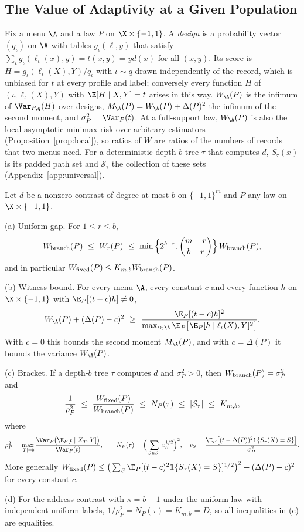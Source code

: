 \subsection{The Value of Adaptivity at a Given Population}\label{app:population}
Fix a menu $\A$ and a law $P$ on $\X\times\{-1,1\}$. A \emph{design} is a
probability vector $(q_\iota)$ on $\A$ with tables $g_\iota(\ell,y)$ that
satisfy $\sum_\iota g_\iota(\ell_\iota(x),y)=t(x,y)=yd(x)$ for all $(x,y)$.
Its score is $H=g_\iota(\ell_\iota(X),Y)/q_\iota$ with $\iota\sim q$ drawn
independently of the record, which is unbiased for $t$ at every profile and
label; conversely every function $H$ of $(\iota,\ell_\iota(X),Y)$ with
$\E[H\mid X,Y]=t$ arises in this way. $W_\A(P)$ is the infimum of
$\Var_{P,q}(H)$ over designs, $M_\A(P)=W_\A(P)+\Delta(P)^2$ the infimum of
the second moment, and $\sigma_P^2=\Var_P(t)$. At a full-support law,
$W_\A(P)$ is also the local asymptotic minimax risk over arbitrary estimators
(Proposition~\ref{prop:local}), so ratios of $W$ are ratios of the numbers of
records that two menus need. For a deterministic depth-$b$ tree $\tau$ that
computes $d$, $S_\tau(x)$ is its padded path set and $\mathcal S_\tau$ the
collection of these sets (Appendix~\ref{app:universal}).

\begin{theorem}\label{thm:bracketfull}
Let $d$ be a nonzero contrast of degree at most $b$ on $\{-1,1\}^m$ and $P$ any
law on $\X\times\{-1,1\}$.

\textup{(a) Uniform gap.} For $1\le r\le b$,
\[
 W_{\rm branch}(P)\ \le\ W_r(P)\ \le\ \min\Big\{2^{b-r},\binom{m-r}{b-r}\Big\}\,W_{\rm branch}(P),
\]
and in particular $W_{\rm fixed}(P)\le K_{m,b}W_{\rm branch}(P)$.

\textup{(b) Witness bound.} For every menu $\A$, every constant $c$ and
every function $h$ on $\X\times\{-1,1\}$ with $\E_P[(t-c)h]\ne0$,
\[
 W_\A(P)+(\Delta(P)-c)^2\ \ge\ \frac{\E_P[(t-c)h]^2}{\max_{\iota\in\A}\E_P\big[\E_P[h\mid\ell_\iota(X),Y]^2\big]}.
\]
With $c=0$ this bounds the second moment $M_\A(P)$, and with $c=\Delta(P)$ it
bounds the variance $W_\A(P)$.

\textup{(c) Bracket.} If a depth-$b$ tree $\tau$ computes $d$ and
$\sigma_P^2>0$, then $W_{\rm branch}(P)=\sigma_P^2$ and
\[
 \frac1{\rho_P^2}\ \le\ \frac{W_{\rm fixed}(P)}{W_{\rm branch}(P)}\ \le\ N_P(\tau)\ \le\ |\mathcal S_\tau|\ \le\ K_{m,b},
\]
where
\[
 \rho_P^2=\max_{|T|=b}\frac{\Var_P\big(\E_P[t\mid X_T,Y]\big)}{\Var_P(t)},
 \qquad
 N_P(\tau)=\Big(\sum_{S\in\mathcal S_\tau}v_S^{1/2}\Big)^2,
 \quad v_S=\frac{\E_P\big[(t-\Delta(P))^2\mathbf 1\{S_\tau(X)=S\}\big]}{\sigma_P^2}.
\]
More generally $W_{\rm fixed}(P)\le\big(\sum_S\E_P[(t-c)^2\mathbf 1\{S_\tau(X)=S\}]^{1/2}\big)^2-(\Delta(P)-c)^2$
for every constant $c$.

\textup{(d)} For the address contrast with $\kappa=b-1$ under the uniform law
with independent uniform labels, $1/\rho_P^2=N_P(\tau)=K_{m,b}=D$, so all
inequalities in \textup{(c)} are equalities.
\end{theorem}

